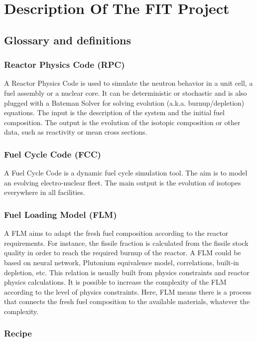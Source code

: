 \documentclass[review]{elsarticle}
\begin{document}
\section{Description Of The FIT Project}
\subsection{Glossary and definitions}
\subsubsection{Reactor Physics Code (RPC)}

A Reactor Physics Code is used to simulate the neutron behavior in a unit cell, a fuel assembly or a nuclear core. It can be deterministic or stochastic and is also plugged with a Bateman Solver for solving evolution (a.k.a. burnup/depletion) equations. The input is the description of the system and the initial fuel composition. The output is the evolution of the isotopic composition or other data, such as reactivity or mean cross sections. 

\subsubsection{Fuel Cycle Code (FCC)}

A Fuel Cycle Code is a dynamic fuel cycle simulation tool. The aim is to model an evolving electro-nuclear fleet. The main output is the evolution of isotopes everywhere in all facilities.

\subsubsection{Fuel Loading Model (FLM)}

A FLM aims to adapt the fresh fuel composition according to the reactor requirements. For instance, the fissile fraction is calculated from the fissile stock quality in order to reach the required burnup of the reactor. A FLM could be based on neural network, Plutonium equivalence model, correlations, built-in depletion, etc. This relation is usually built from physics constraints and reactor physics calculations. It is possible to increase the complexity of the FLM according to the level of physics constraints. Here, FLM means there is a process that connects the fresh fuel composition to the available materials, whatever the complexity.

\subsubsection{Recipe}
\end{document}
